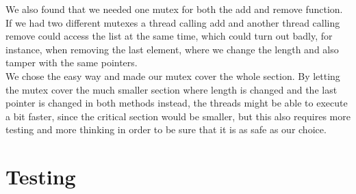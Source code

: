 We also found that we needed one mutex for both the add and remove function. If we had two different mutexes a thread calling add and another thread calling remove could access the list at the same time, which could turn out badly, for instance, when removing the last element, where we change the length and also tamper with the same pointers.\\

We chose the easy way and made our mutex cover the whole section. By letting the mutex cover the much smaller section where length is changed and the last pointer is changed in both methods instead, the threads might be able to execute a bit faster, since the critical section would be smaller, but this also requires more testing and more thinking in order to be sure that it is as safe as our choice.\\

\section{Testing}
